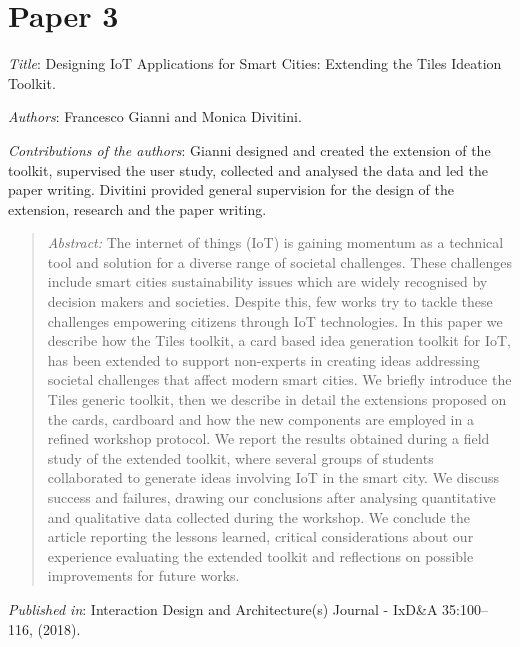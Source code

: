 \section[P3: Designing IoT Applications for Smart Cities: Extending the Tiles Ideation Toolkit.][Paper 3]{Paper 3}
\label{paper-3}

\emph{Title}: Designing IoT Applications for Smart Cities: Extending the Tiles Ideation Toolkit.

\emph{Authors}: Francesco Gianni and Monica Divitini.

\emph{Contributions of the authors}: Gianni designed and created the extension of the toolkit, supervised the user study, collected and analysed the data and led the paper writing. Divitini provided general supervision for the design of the extension, research and the paper writing.

\begin{quote}
	\emph{Abstract:} The internet of things (IoT) is gaining momentum as a technical tool and solution for a diverse range of societal challenges. These challenges include smart cities sustainability issues which are widely recognised by decision makers and societies. Despite this, few works try to tackle these challenges empowering citizens through IoT technologies. In this paper we describe how the Tiles toolkit, a card based idea generation toolkit for IoT, has been extended to support non-experts in creating ideas addressing societal challenges that affect modern smart cities. We briefly introduce the Tiles generic toolkit, then we describe in detail the extensions proposed on the cards, cardboard and how the new components are employed in a refined workshop protocol. We report the results obtained during a field study of the extended toolkit, where several groups of students collaborated to generate ideas involving IoT in the smart city. We discuss success and failures, drawing our conclusions after analysing quantitative and qualitative data collected during the workshop. We conclude the article reporting the lessons learned, critical considerations about our experience evaluating the extended toolkit and reflections on possible improvements for future works.
\end{quote}

\emph{Published in}: Interaction Design and Architecture(s) Journal - IxD\&A 35:100--116, (2018).

